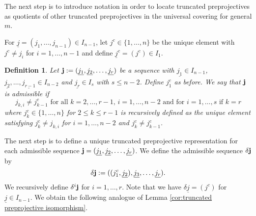 \documentclass{amsart}
\newtheorem{definition}[theorem]{Definition}
\numberwithin{equation}{section}
\newcommand{\uj}{{\underline j}}
\newcommand{\ses}[3]{0\rightarrow #1\rightarrow #2\rightarrow#3\rightarrow 0}
\begin{document}
The next step is to introduce notation in order to locate truncated preprojectives as quotients of other truncated preprojectives in the universal covering for general $m$.

For $\uj=(j_1,\ldots,j_{n-1})\in I_{n-1}$, let $j^c\in \{1,\ldots,n\}$ be the unique element with $j^c\neq j_i$ for $i=1,\ldots,n-1$ and define $\uj^c=(j^c)\in I_1$.



\begin{definition}Let ${\bf j}:=(\underline{j_1},\underline{j_2},\ldots,\underline{j_r})$ be a sequence with $\underline{j_1}\in I_{n-1}$, $\underline{j_2},\ldots,\underline{j_{r-1}}\in I_{n-2}$ and $\underline{j_r}\in I_s$ with $s\leq n-2$. Define $j_1^c$ as before.
 We say that ${\bf j}$ is admissible if 
$$ j_{k,i}\neq j_{k-1}^{c}\text{ for all }k=2,\ldots, r-1,\,i=1,\ldots,n-2\text{ and for }i=1,\ldots,s\text{ if }k=r$$
where $j_{k}^c\in\{1,\ldots,n\}$ for $2\leq k\leq r-1$ is recursively defined as the unique element satisfying $j_k^c\neq j_{k,i}$ for $i=1,\ldots,n-2$ and $j_k^c\neq j_{k-1}^c$. 
\end{definition}


The next step is to define a unique truncated preprojective representation for each admissible sequence ${\bf j}=(\underline{j_1},\underline{j_2},\ldots,\underline{j_r})$. We define the admissible sequence $\delta {\bf j}$ by
\[\delta {\bf j}:=((j_1^c,\underline{j_2}),\underline{j_3},\ldots,\underline{j_r}).\]
We recursively define $\delta^i{\bf j}$ for $i=1,\dots,r$.
Note that we have $\delta\uj=(j^c)$ for $\uj\in I_{n-1}$. We obtain the following analogue of Lemma \ref{cor:truncated preprojective isomorphism}.
\end{document}
